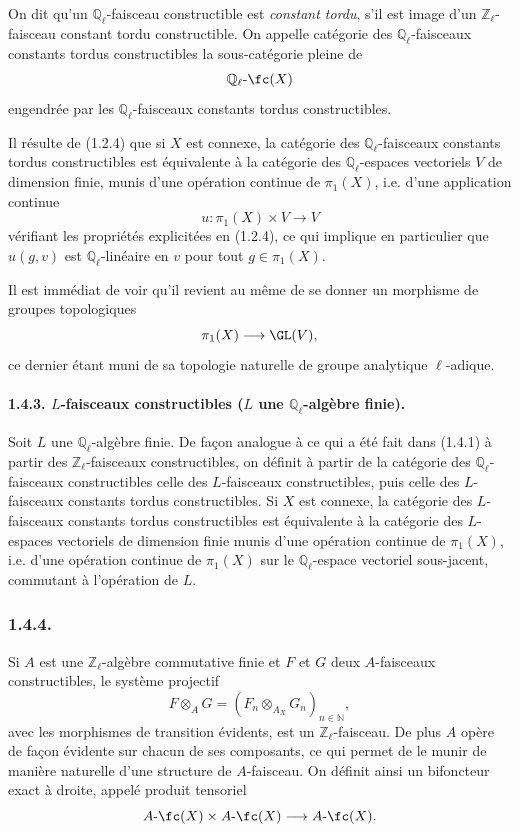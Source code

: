 On dit qu'un \(\mathbb{Q}_\ell\)-faisceau constructible est \emph{constant tordu}, s'il est image d'un \(\mathbb{Z}_\ell\)-faisceau constant tordu constructible. On appelle catégorie des \(\mathbb{Q}_\ell\)-faisceaux constants tordus constructibles la sous-catégorie pleine de
\[
\mathbb{Q}_\ell\text{-}\fc(X)
\]
engendrée par les \(\mathbb{Q}_\ell\)-faisceaux constants tordus constructibles.

Il résulte de (1.2.4) que si \(X\) est connexe, la catégorie des \(\mathbb{Q}_\ell\)-faisceaux constants tordus constructibles est équivalente à la catégorie des \(\mathbb{Q}_\ell\)-espaces vectoriels \(V\) de dimension finie, munis d'une opération continue de \(\pi_1(X)\), i.e. d'une application continue
\[
u:\pi_1(X)\times V\longrightarrow V
\]
vérifiant les propriétés explicitées en (1.2.4), ce qui implique en particulier que \(u(g,v)\) est \(\mathbb{Q}_\ell\)-linéaire en \(v\) pour tout \(g\in\pi_1(X)\).

Il est immédiat de voir qu'il revient au même de se donner un morphisme de groupes topologiques
\[
\pi_1(X)\longrightarrow \GL(V),
\]
ce dernier étant muni de sa
topologie naturelle de groupe analytique \(\ell\)-adique.

\paragraph{1.4.3. \(L\)-faisceaux constructibles (\(L\) une \(\mathbb{Q}_\ell\)-algèbre finie).}
Soit \(L\) une \(\mathbb{Q}_\ell\)-algèbre finie. De façon analogue à ce qui a été fait dans (1.4.1) à partir des \(\mathbb{Z}_\ell\)-faisceaux constructibles, on définit à partir de la catégorie des \(\mathbb{Q}_\ell\)-faisceaux constructibles celle des \(L\)-faisceaux constructibles, puis celle des \(L\)-faisceaux constants tordus constructibles. Si \(X\) est connexe, la catégorie des \(L\)-faisceaux constants tordus constructibles est équivalente à la catégorie des \(L\)-espaces vectoriels de dimension finie munis d'une opération continue de \(\pi_1(X)\), i.e. d'une opération continue de \(\pi_1(X)\) sur le \(\mathbb{Q}_\ell\)-espace vectoriel sous-jacent, commutant à l'opération de \(L\).

\subsubsection*{1.4.4.}
Si \(A\) est une \(\mathbb{Z}_\ell\)-algèbre commutative finie et \(F\) et \(G\) deux \(A\)-faisceaux constructibles, le système projectif
\[
F\otimes_A G=(F_n\otimes_{A_X} G_n)_{n\in\mathbb{N}},
\]
avec les morphismes de transition évidents, est un \(\mathbb{Z}_\ell\)-faisceau. De plus \(A\) opère de façon évidente sur chacun de ses composants, ce qui permet de le munir de manière naturelle d'une structure de \(A\)-faisceau. On définit ainsi un bifoncteur exact à droite, appelé produit tensoriel
\[
A\text{-}\fc(X)\times A\text{-}\fc(X)\longrightarrow A\text{-}\fc(X).
\]

